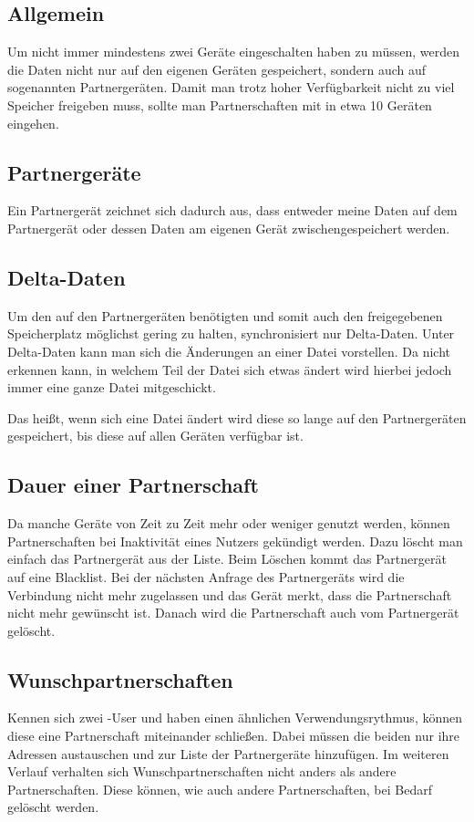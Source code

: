 \subsection{Allgemein}
Um nicht immer mindestens zwei Geräte eingeschalten haben zu müssen, werden die Daten nicht nur auf den eigenen Geräten gespeichert, sondern auch auf sogenannten Partnergeräten. Damit man trotz hoher Verfügbarkeit nicht zu viel Speicher freigeben muss, sollte man Partnerschaften mit in etwa 10 Geräten eingehen. 

\subsection{Partnergeräte} \label{Partnergerät}
Ein Partnergerät zeichnet sich dadurch aus, dass entweder meine Daten auf dem Partnergerät oder dessen Daten am eigenen Gerät zwischengespeichert werden. 

\subsection{Delta-Daten}
Um den auf den Partnergeräten benötigten und somit auch den freigegebenen Speicherplatz möglichst gering zu halten, synchronisiert \sblit nur Delta-Daten. Unter Delta-Daten kann man sich die Änderungen an einer Datei vorstellen. Da \sblit nicht erkennen kann, in welchem Teil der Datei sich etwas ändert wird hierbei jedoch immer eine ganze Datei mitgeschickt.

Das heißt, wenn sich eine Datei ändert wird diese so lange auf den Partnergeräten gespeichert, bis diese auf allen Geräten verfügbar ist.

\subsection{Dauer einer Partnerschaft}
Da manche Geräte von Zeit zu Zeit mehr oder weniger genutzt werden, können Partnerschaften bei Inaktivität eines Nutzers gekündigt werden. Dazu löscht man einfach das Partnergerät aus der Liste. Beim Löschen kommt das Partnergerät auf eine Blacklist. Bei der nächsten Anfrage des Partnergeräts wird die Verbindung nicht mehr zugelassen und das Gerät merkt, dass die Partnerschaft nicht mehr gewünscht ist. Danach wird die Partnerschaft auch vom Partnergerät gelöscht.

\subsection{Wunschpartnerschaften}
Kennen sich zwei \sblit-User und haben einen ähnlichen Verwendungsrythmus, können diese eine Partnerschaft miteinander schließen. Dabei müssen die beiden nur ihre Adressen austauschen und zur Liste der Partnergeräte hinzufügen. Im weiteren Verlauf verhalten sich Wunschpartnerschaften nicht anders als andere Partnerschaften. Diese können, wie auch andere Partnerschaften, bei Bedarf gelöscht werden.

